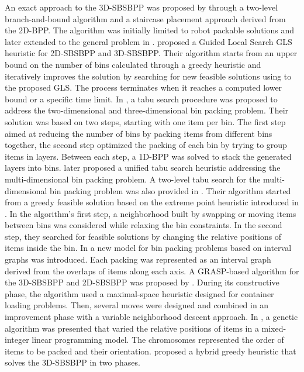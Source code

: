 An exact approach to the 3D-SBSBPP was proposed by \cite{martello2000three} through a two-level branch-and-bound algorithm and a staircase placement approach derived from the 2D-BPP.
The algorithm was initially limited to robot packable solutions and later extended to the general problem in \cite{martello2007exact}.
\cite{faroe2003guided} proposed a Guided Local Search GLS heuristic for 2D-SBSBPP and 3D-SBSBPP.
Their algorithm starts from an upper bound on the number of bins calculated through a greedy heuristic and iteratively improves the solution by searching for new feasible solutions using to the proposed GLS.
The process terminates when it reaches a computed lower bound or a specific time limit.
In \cite{lodi2002heuristic}, a tabu search procedure was proposed to address the two-dimensional and three-dimensional bin packing problem.
Their solution was based on two steps, starting with one item per bin.
The first step aimed at reducing the number of bins by packing items from different bins together, the second step optimized the packing of each bin by trying to group items in layers.
Between each step, a 1D-BPP was solved to stack the generated layers into bins.
\cite{Lodi2004} later proposed a unified tabu search heuristic addressing the multi-dimensional bin packing problem.
A two-level tabu search for the multi-dimensional bin packing problem was also provided in \cite{crainic2009ts2pack}.
Their algorithm started from a greedy feasible solution based on the extreme point heuristic introduced in \cite{crainic2008extreme}.
In the algorithm's first step, a neighborhood built by swapping or moving items between bins was considered while relaxing the bin constraints.
In the second step, they searched for feasible solutions by changing the relative positions of items inside the bin.
In \cite{fekete2004combinatorial} a new model for bin packing problems based on interval graphs was introduced.
Each packing was represented as an interval graph derived from the overlaps of items along each axis.
A GRASP-based algorithm for the 3D-SBSBPP and 2D-SBSBPP was proposed by \cite{parreno2010hybrid}. During its constructive phase, the algorithm used a maximal-space heuristic designed for container loading problems.
Then, several moves were designed and combined in an improvement phase with a variable neighborhood descent approach.
In \cite{WU2010347}, a genetic algorithm was presented that varied the relative positions of items in a mixed-integer linear programming model. The chromosomes represented the order of items to be packed and their orientation.
\cite{hifi2014hybrid} proposed a hybrid greedy heuristic that solves the 3D-SBSBPP in two phases.
